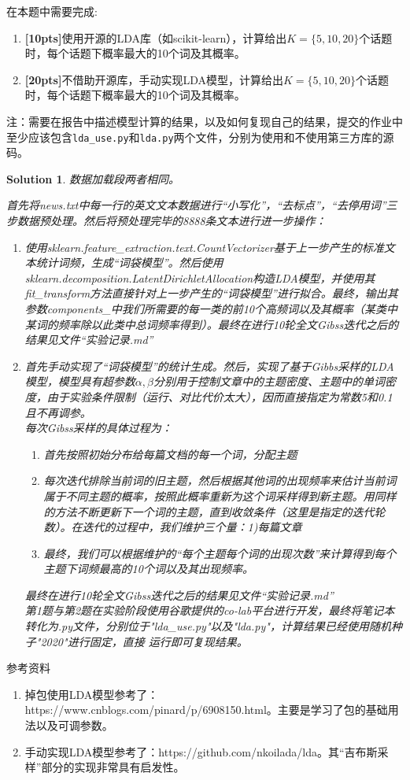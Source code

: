 \documentclass[a4paper,UTF8]{article}
\newtheorem*{solution}{Solution}
\numberwithin{equation}{section}
\begin{document}
在本题中需要完成:
\begin{enumerate}
    \item \textbf{[10pts]}使用开源的LDA库（如scikit-learn），计算给出$K=\{5, 10, 20\}$个话题时，每个话题下概率最大的10个词及其概率。
    \item \textbf{[20pts]}不借助开源库，手动实现LDA模型，计算给出$K=\{5, 10, 20\}$个话题时，每个话题下概率最大的10个词及其概率。
\end{enumerate}
注：需要在报告中描述模型计算的结果，以及如何复现自己的结果，提交的作业中至少应该包含\texttt{lda\_use.py}和\texttt{lda.py}两个文件，分别为使用和不使用第三方库的源码。
\begin{solution}
	数据加载段两者相同。

	首先将news.txt中每一行的英文文本数据进行“小写化”，“去标点”，“去停用词”三步数据预处理。然后将预处理完毕的8888条文本进行进一步操作：
\begin{enumerate}
	\item 使用sklearn.feature\_extraction.text.CountVectorizer基于上一步产生的标准文本统计词频，生成“词袋模型”。然后使用sklearn.decomposition.LatentDirichletAllocation构造LDA模型，并使用其fit\_transform方法直接针对上一步产生的“词袋模型”进行拟合。最终，输出其参数components\_中我们所需要的每一类的前10个高频词以及其概率（某类中某词的频率除以此类中总词频率得到）。最终在进行10轮全文Gibss迭代之后的结果见文件“实验记录.md”
	\item 首先手动实现了“词袋模型”的统计生成。然后，实现了基于Gibbs采样的LDA模型，模型具有超参数$\alpha,\beta$分别用于控制文章中的主题密度、主题中的单词密度，由于实验条件限制（运行、对比代价太大），因而直接指定为常数5和0.1且不再调参。\\
		  每次Gibss采样的具体过程为：
		  \begin{enumerate}
			  \item 首先按照初始分布给每篇文档的每一个词，分配主题
			  \item 每次迭代排除当前词的旧主题，然后根据其他词的出现频率来估计当前词属于不同主题的概率，按照此概率重新为这个词采样得到新主题。用同样的方法不断更新下一个词的主题，直到收敛条件（这里是指定的迭代轮数）。在迭代的过程中，我们维护三个量：1)每篇文章
			  \item 最终，我们可以根据维护的“每个主题每个词的出现次数”来计算得到每个主题下词频最高的10个词以及其出现频率。
		\end{enumerate}
		最终在进行10轮全文Gibss迭代之后的结果见文件“实验记录.md”\\
		第1题与第2题在实验阶段使用谷歌提供的co-lab平台进行开发，最终将笔记本转化为.py文件，分别位于"lda\_use.py"以及"lda.py"，计算结果已经使用随机种子"2020"进行固定，直接
		运行即可复现结果。
\end{enumerate}
\end{solution}
\newpage

参考资料
\begin{enumerate}
	\item 掉包使用LDA模型参考了：https://www.cnblogs.com/pinard/p/6908150.html。主要是学习了包的基础用法以及可调参数。
	\item 手动实现LDA模型参考了：https://github.com/nkoilada/lda。其“吉布斯采样”部分的实现非常具有启发性。
\end{enumerate}

\end{document}
